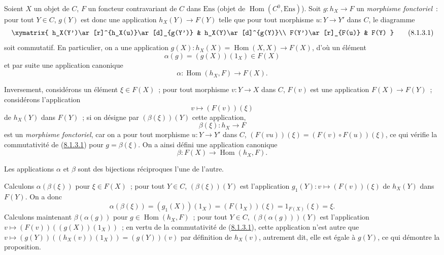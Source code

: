 \begin{env}[8.1.3]
\label{0.8.1.3-fr}
Soient $X$ un objet de $C$, $F$ un foncteur contravariant de $C$ dans
$\mathrm{Ens}$ (objet de $\operatorname{Hom}(C^0,\mathrm{Ens})$). Soit
$g:h_X\to F$ un \emph{morphisme fonctoriel}~: pour tout $Y\in C$,
$g(Y)$ est donc une application $h_X(Y)\to F(Y)$ telle que pour tout morphisme
$u:Y\to Y'$ dans $C$, le diagramme
\[
  \xymatrix{
    h_X(Y')\ar[r]^{h_X(u)}\ar[d]_{g(Y')} &
    h_X(Y)\ar[d]^{g(Y)}\\
    F(Y')\ar[r]_{F(u)} & F(Y)
  }
  \tag{8.1.3.1}\label{0.8.1.3.1-fr}
\]
soit commutatif. En particulier, on a une application
$g(X):h_X(X)=\operatorname{Hom}(X,X)\to F(X)$, d'où un élément
\[
  \alpha(g)=(g(X))(1_X)\in F(X)
  \tag{8.1.3.2}
\]
et par suite une application canonique
\[
  \alpha:\operatorname{Hom}(h_X,F)\to F(X).
  \tag{8.1.3.3}
\]

Inversement, considérons un élément $\xi\in F(X)$~; pour tout morphisme
$v:Y\to X$ dans $C$, $F(v)$ est une application $F(X)\to F(Y)$~;
considérons l'application
\[
  v\mapsto(F(v))(\xi)
  \tag{8.1.3.4}
\]
de $h_X(Y)$ dans $F(Y)$~; si on désigne par $(\beta(\xi))(Y)$ cette
application,
\[
  \beta(\xi):h_X\to F
  \tag{8.1.3.5}
\]
est un \emph{morphisme fonctoriel}, car on a pour tout morphisme
$u:Y\to Y'$ dans $C$,
$(F(vu))(\xi)=(F(v)\circ F(u))(\xi)$, ce qui vérifie la commutativité de
(\hyperref[0.8.1.3.1-fr]{8.1.3.1}) pour $g=\beta(\xi)$. On a ainsi défini
une application canonique
\[
  \beta:F(X)\to\operatorname{Hom}(h_X,F).
  \tag{8.1.3.6}
\]
\end{env}

\begin{proposition}[8.1.4]
\label{0.8.1.4-fr}
Les applications $\alpha$ et $\beta$ sont des bijections réciproques l'une de
l'autre.
\end{proposition}

Calculons $\alpha(\beta(\xi))$ pour $\xi\in F(X)$~; pour tout $Y\in C$,
$(\beta(\xi))(Y)$ est l'application
$g_1(Y):v\mapsto(F(v))(\xi)$ de $h_X(Y)$ dans $F(Y)$. On a donc
\[
  \alpha(\beta(\xi))=(g_1(X))(1_X)=(F(1_X))(\xi)
  =1_{F(X)}(\xi)=\xi.
\]
Calculons maintenant $\beta(\alpha(g))$ pour
$g\in\operatorname{Hom}(h_X,F)$~; pour tout $Y\in C$,
$(\beta(\alpha(g)))(Y)$ est l'application
$v\mapsto(F(v))((g(X))(1_X))$~; en vertu de la commutativité de
(\hyperref[0.8.1.3.1-fr]{8.1.3.1}), cette application n'est autre que
$v\mapsto(g(Y))((h_X(v))(1_X))=(g(Y))(v)$ par définition de $h_X(v)$,
autrement dit, elle est égale à $g(Y)$, ce qui démontre la proposition.

